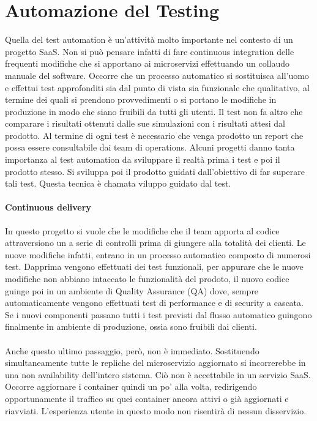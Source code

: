 \section{Automazione del Testing}
Quella del test automation è un'attività molto importante nel contesto di un progetto SaaS. Non si può pensare infatti di fare continuous integration delle frequenti modifiche che si apportano ai microservizi effettuando un collaudo manuale del software. Occorre che un processo automatico si sostituisca all'uomo e effettui test approfonditi sia dal punto di vista sia funzionale che qualitativo, al termine dei quali si prendono provvedimenti o si portano le modifiche in produzione in modo che siano fruibili da tutti gli utenti. Il test non fa altro che comparare i risultati ottenuti dalle sue simulazioni con i risultati attesi dal prodotto. Al termine di ogni test è necessario che venga prodotto un report che possa essere consultabile dai team di operations. Alcuni progetti danno tanta importanza al test automation da sviluppare il realtà prima i test e poi il prodotto stesso. Si sviluppa poi il prodotto guidati dall'obiettivo di far superare tali test. Questa tecnica è chamata viluppo guidato dal test.
\paragraph{Continuous delivery}
In questo progetto si vuole che le modifiche che il team apporta al codice attraversiono un a serie di controlli prima di giungere alla totalità dei clienti. Le nuove modifiche infatti, entrano in un processo automatico composto di numerosi test. Dapprima vengono effettuati dei test funzionali, per appurare che le nuove modifiche non abbiano intaccato le funzionalità del prodoto, il nuovo codice guinge poi in un ambiente di Quality Assurance (QA) dove, sempre automaticamente vengono effettuati test di performance e di security a cascata. Se i nuovi componenti passano tutti i test previsti dal flusso automatico guingono finalmente in ambiente di produzione, ossia sono fruibili dai clienti. 
\paragraph{}
Anche questo ultimo passaggio, però, non è immediato. Sostituendo simultaneamente tutte le repliche del microservizio aggiornato si incorrerebbe in una non availability dell'intero sistema. Ciò non è accettabile in un servizio SaaS. Occorre aggiornare i container quindi un po' alla volta, redirigendo opportunamente il traffico su quei container ancora attivi o già aggiornati e riavviati. L'esperienza utente in questo modo non risentirà di nessun disservizio.
